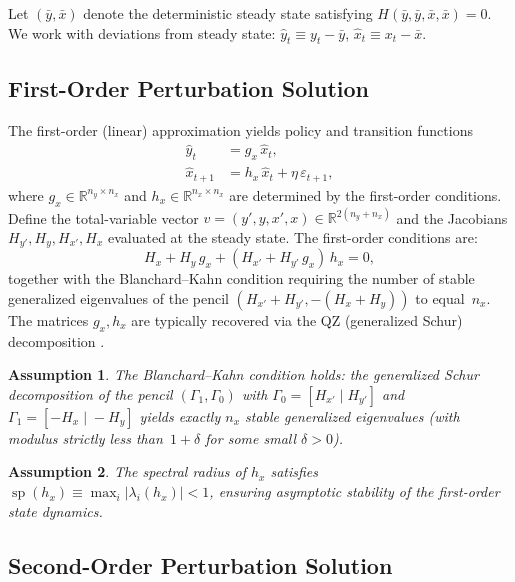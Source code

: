 \documentclass[12pt,a4paper]{article}
\newtheorem{assumption}{Assumption}
\newcommand{\R}{\mathbb{R}}
\newcommand{\gx}{g_x}
\newcommand{\hx}{h_x}
\DeclareMathOperator{\specrad}{sp}
\begin{document}
Let $(\bar{y}, \bar{x})$ denote the deterministic steady state
satisfying $H(\bar{y}, \bar{y}, \bar{x}, \bar{x}) = 0$. We work
with deviations from steady state:
$\hat{y}_t \equiv y_t - \bar{y}$, $\hat{x}_t \equiv x_t - \bar{x}$.

\subsection{First-Order Perturbation Solution}\label{sec:first-order}

The first-order (linear) approximation yields policy and transition
functions
\begin{align}
\hat{y}_t &= \gx\,\hat{x}_t, \label{eq:fo-y}\\
\hat{x}_{t+1} &= \hx\,\hat{x}_t + \eta\,\varepsilon_{t+1},
  \label{eq:fo-x}
\end{align}
where $\gx \in \R^{n_y \times n_x}$ and $\hx \in \R^{n_x \times n_x}$
are determined by the first-order conditions. Define the total-variable
vector $v = (y', y, x', x) \in \R^{2(n_y + n_x)}$ and the Jacobians
$H_{y'}, H_y, H_{x'}, H_x$ evaluated at the steady state. The
first-order conditions are:
\begin{equation}\label{eq:fo-implicit}
H_x + H_y\,\gx + (H_{x'} + H_{y'}\,\gx)\,\hx = 0,
\end{equation}
together with the Blanchard--Kahn condition requiring the number of
stable generalized eigenvalues of the pencil $(H_{x'} + H_{y'}, -(H_x + H_y))$
to equal~$n_x$. The matrices $\gx, \hx$ are typically recovered via
the QZ (generalized Schur) decomposition \citep{klein2000using}.

\begin{assumption}\label{ass:bk}
The Blanchard--Kahn condition holds: the generalized Schur
decomposition of the pencil $(\Gamma_1, \Gamma_0)$ with
$\Gamma_0 = [H_{x'}\;|\;H_{y'}]$ and $\Gamma_1 = [-H_x\;|\;-H_y]$
yields exactly $n_x$ stable generalized eigenvalues
(with modulus strictly less than~$1 + \delta$ for some small
$\delta > 0$).
\end{assumption}

\begin{assumption}\label{ass:stable}
The spectral radius of $\hx$ satisfies
$\specrad(\hx) \equiv \max_i |\lambda_i(\hx)| < 1$, ensuring asymptotic
stability of the first-order state dynamics.
\end{assumption}

\subsection{Second-Order Perturbation Solution}\label{sec:second-order}
\end{document}
